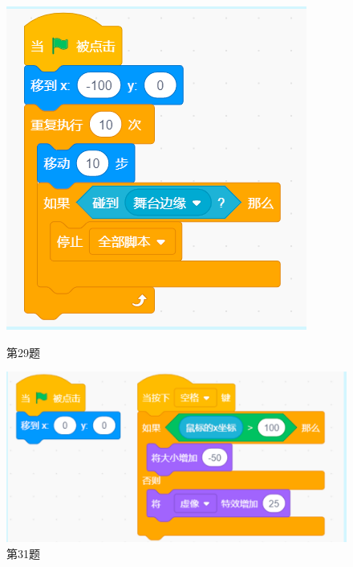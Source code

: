 \documentclass[10pt, a4paper]{article}
\begin{document}
\begin{enumerate}
        \begin{figure}[htbp]
            \centering
            \begin{minipage}[t]{.18\textwidth}
                \centering
                \includegraphics[width=\textwidth]{29.png}
                \caption*{第29题}
            \end{minipage}
            \begin{minipage}[t]{.38\textwidth}
                \centering
                \includegraphics[width=\textwidth]{31.png}
                \caption*{第31题}
            \end{minipage}
            \begin{minipage}[t]{.15\textwidth}

\end{minipage}
\end{figure}
\end{enumerate}
\end{document}
